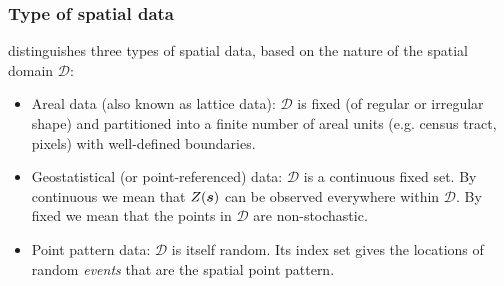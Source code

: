 \documentclass[12pt]{beamer}
\newcommand{\bs}{ \mbox{\boldmath $s$}}
\begin{document}
\begin{frame}
\frametitle{Type of spatial data}
\cite{Cressie1993} distinguishes three types of spatial data, based on the nature of the spatial domain $\mathcal{D}$:
\begin{itemize}
 \item \vfill \alert{Areal data (also known as lattice data)}: $\mathcal{D}$ is fixed (of regular or irregular shape) and partitioned into a finite number of areal units (e.g. census tract, pixels) with well-defined boundaries. %

\item \vfill \alert{Geostatistical (or point-referenced) data}: $\mathcal{D}$ is a continuous fixed set. By continuous we mean that $Z(\bs)$ can be observed everywhere within $\mathcal{D}$. By fixed we mean that the points in $\mathcal{D}$ are non-stochastic. %

\item \vfill \alert{Point pattern data}: $\mathcal{D}$ is itself random. Its index set gives the locations of random \emph{events} that are the spatial point pattern. %
\end{itemize}
\end{frame}
\end{document}
